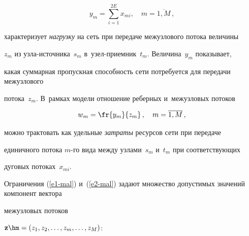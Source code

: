 \noindent


$$  


y_m = \sum\limits_{i=1}^{2E} x_{mi}, \quad m = \overline{1, M}\,, 


$$





\vspace*{-2pt}





\noindent


характеризует \textit{нагрузку} на сеть  при передаче  межузлового потока величины 


$z_m$ из уз\-ла-ис\-точ\-ни\-ка~$s_m$  в~узел-при\-ем\-ник~$t_m$. Величина~$y_m$ показывает, 


какая суммарная пропускная способность сети потребуется для передачи межузлового 


потока~$z_m$. В~рамках модели отношение реберных и~межузловых потоков





\vspace*{1pt}





\noindent


$$ 


w_m = \fr{y_m}{z_m}\,,  \quad m = \overline{1, M}\,,


$$





\vspace*{-2pt}





\noindent


можно трактовать как удельные \textit{затраты}  ресурсов сети при передаче 


единичного   потока $m$-го вида между узлами~$s_m$ и~$t_m$ при  соответствующих 


дуговых потоках~$x_{mi}$.





Ограничения (\ref{e1-mal}) и~(\ref{e2-mal}) задают множество  допустимых значений компонент вектора 


межузловых потоков


$\mathbf{z} \hm= (z_1, z_2, \ldots, z_m, \ldots, z_M)$:





